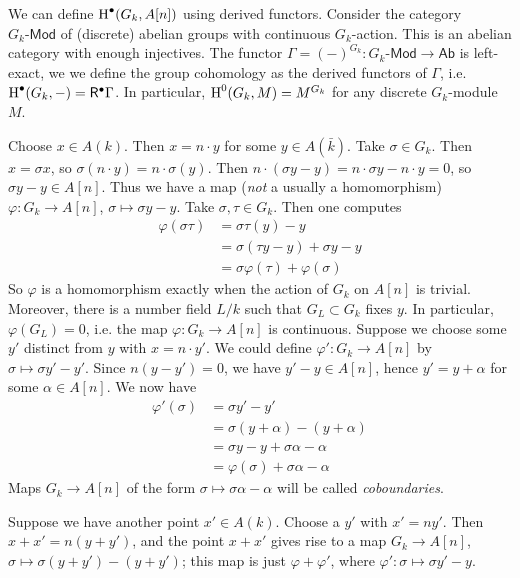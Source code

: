 \documentclass{article}
\begin{document}
We can define $\operatorname{H}^\bullet(G_k,A[n])$ using derived functors. Consider the 
category $G_k\text{-}\mathsf{Mod}$ of (discrete) abelian groups with continuous 
$G_k$-action. This is an abelian category with enough injectives. The functor 
$\Gamma=(-)^{G_k}:G_k\text{-}\mathsf{Mod}\to \mathsf{Ab}$ is left-exact, we we 
define the group cohomology as the derived functors of $\Gamma$, i.e. 
$\operatorname{H}^\bullet(G_k,-) = \mathsf{R}^\bullet \Gamma$. In particular, 
$\operatorname{H}^0(G_k,M) = M^{G_k}$ for any discrete $G_k$-module $M$. 

Choose $x\in A(k)$. Then $x=n\cdot y$ for some $y\in A(\bar k)$. Take 
$\sigma\in G_k$. Then $x=\sigma x$, so $\sigma(n\cdot y) = n\cdot \sigma(y)$. 
Then $n\cdot (\sigma y - y) = n\cdot \sigma y - n\cdot y = 0$, so 
$\sigma y-y\in A[n]$. Thus we have a map (\emph{not} a usually a homomorphism) 
$\varphi:G_k\to A[n]$, $\sigma\mapsto \sigma y - y$. Take $\sigma,\tau\in G_k$. 
Then one computes 
\begin{align*}
  \varphi(\sigma\tau) &= \sigma\tau(y) - y \\
    &= \sigma(\tau y - y) + \sigma y -y \\
    &= \sigma\varphi(\tau) + \varphi(\sigma)
\end{align*}
So $\varphi$ is a homomorphism exactly when the action of $G_k$ on 
$A[n]$ is trivial. Moreover, there is a number field $L/k$ such that 
$G_L\subset G_k$ fixes $y$. In particular, $\varphi(G_L)=0$, i.e. the map 
$\varphi:G_k\to A[n]$ is continuous. Suppose we choose some $y'$ distinct from 
$y$ with $x=n\cdot y'$. We could define $\varphi':G_k\to A[n]$ by 
$\sigma\mapsto \sigma y'-y'$. Since $n(y-y')=0$, we have $y'-y\in A[n]$, hence 
$y'=y+\alpha$ for some $\alpha\in A[n]$. We now have 
\begin{align*}
  \varphi'(\sigma) &= \sigma y'-y' \\
    &= \sigma(y+\alpha) - (y+\alpha) \\
    &= \sigma y - y + \sigma\alpha-\alpha \\
    &= \varphi(\sigma) + \sigma \alpha-\alpha
\end{align*}
Maps $G_k\to A[n]$ of the form $\sigma\mapsto \sigma \alpha-\alpha$ will be 
called \emph{coboundaries}. 

Suppose we have another point $x'\in A(k)$. Choose a $y'$ with $x'=n y'$. Then 
$x+x'=n(y+y')$, and the point $x+x'$ gives rise to a map $G_k\to A[n]$, 
$\sigma\mapsto \sigma(y+y')-(y+y')$; this map is just $\varphi+\varphi'$, where 
$\varphi':\sigma\mapsto \sigma y'-y$. 
\end{document}

